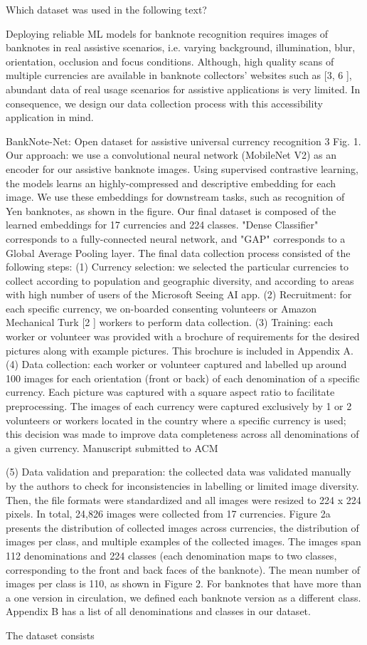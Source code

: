 Which dataset was used in the following text?

Deploying reliable ML models for banknote recognition requires images of banknotes in real assistive scenarios, i.e.
varying background, illumination, blur, orientation, occlusion and focus conditions. Although, high quality scans of
multiple currencies are available in banknote collectors’ websites such as [3, 6 ], abundant data of real usage scenarios
for assistive applications is very limited. In consequence, we design our data collection process with this accessibility
application in mind.

BankNote-Net: Open dataset for assistive universal currency recognition 3
Fig. 1. Our approach: we use a convolutional neural network (MobileNet V2) as an encoder for our assistive banknote images. Using
supervised contrastive learning, the models learns an highly-compressed and descriptive embedding for each image. We use these
embeddings for downstream tasks, such as recognition of Yen banknotes, as shown in the figure. Our final dataset is composed of the
learned embeddings for 17 currencies and 224 classes. "Dense Classifier" corresponds to a fully-connected neural network, and "GAP"
corresponds to a Global Average Pooling layer.
The final data collection process consisted of the following steps:
(1) Currency selection: we selected the particular currencies to collect according to population and geographic
diversity, and according to areas with high number of users of the Microsoft Seeing AI app.
(2) Recruitment: for each specific currency, we on-boarded consenting volunteers or Amazon Mechanical Turk [2 ]
workers to perform data collection.
(3) Training: each worker or volunteer was provided with a brochure of requirements for the desired pictures along
with example pictures. This brochure is included in Appendix A.
(4) Data collection: each worker or volunteer captured and labelled up around 100 images for each orientation
(front or back) of each denomination of a specific currency. Each picture was captured with a square aspect
ratio to facilitate preprocessing. The images of each currency were captured exclusively by 1 or 2 volunteers
or workers located in the country where a specific currency is used; this decision was made to improve data
completeness across all denominations of a given currency.
Manuscript submitted to ACM


(5) Data validation and preparation: the collected data was validated manually by the authors to check for
inconsistencies in labelling or limited image diversity. Then, the file formats were standardized and all images
were resized to 224 x 224 pixels.
In total, 24,826 images were collected from 17 currencies. Figure 2a presents the distribution of collected images
across currencies, the distribution of images per class, and multiple examples of the collected images. The images span
112 denominations and 224 classes (each denomination maps to two classes, corresponding to the front and back faces
of the banknote). The mean number of images per class is 110, as shown in Figure 2. For banknotes that have more
than a one version in circulation, we defined each banknote version as a different class. Appendix B has a list of all
denominations and classes in our dataset.

The dataset consists